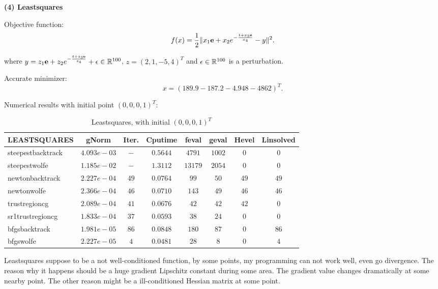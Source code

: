 \documentclass[11pt]{report}
\begin{document}
\textbf{(4) Leastsquares }

Objective function: 
\begin{equation}
    f(x) = \frac{1}{2}\|x_1\mathbf{e}+x_2e^{-\frac{t+x_3\mathbf{e}}{x_4}}-y\|^2.
\end{equation}

where $y=z_1\mathbf{e}+z_2e^{-\frac{t+z_3\mathbf{e}}{z_4}} + \epsilon\in \mathbb{R}^{100}$, $z=(2,1,-5,4)^T$ and $\epsilon\in \mathbb{R}^{100}$ is a perturbation.

Accurate minimizer:
\begin{equation}
   x = (189.9  -187.2  -4.948  -4862)^T.
\end{equation}

Numerical results with initial point $(0,0,0,1)^T$:
\begin{table}[H]
    \caption{Leastsquares, with initial $(0,0,0,1)^T$}
    \label{tab:Leastsquares_initial}
    \begin{center}
        \begin{tabular}{l|ccccccc}
\textbf{LEASTSQUARES}&  gNorm       &   Iter.  &   Cputime   &   feval&geval&Hevel&Linsolved\\
\hline
steepestbacktrack   &   $4.093e-03 $&   $- $&   $0.5644  $&$4791 $&$1002 $&$0    $&$0    $       \\
steepestwolfe       &   $1.185e-02 $&   $- $&   $1.3112  $&$13179$&$2054 $&$0    $&$0    $       \\
newtonbacktrack     &   $2.227e-04 $&   $49   $&   $0.0764  $&$99   $&$50   $&$49   $&$49   $       \\
newtonwolfe         &   $2.366e-04 $&   $46   $&   $0.0710  $&$143  $&$49   $&$46   $&$46   $       \\
trustregioncg       &   $2.089e-04 $&   $41   $&   $0.0676  $&$42   $&$42   $&$42   $&$0    $       \\
sr1trustregioncg    &   $1.833e-04 $&   $37   $&   $0.0593  $&$38   $&$24   $&$0    $&$0    $       \\
bfgsbacktrack       &   $1.981e-05 $&   $86   $&   $0.0848  $&$180  $&$87   $&$0    $&$86   $       \\
bfgswolfe           &   $2.227e-05 $&   $4    $&   $0.0481  $&$28   $&$8    $&$0    $&$4    $       \\
 \end{tabular}
    \end{center}
\end{table}

Leastsquares suppose to be a not well-conditioned function, by some points, my programming can not work well, even go divergence. The reason why it happens should be a huge gradient Lipschitz constant during some area. The gradient value changes dramatically at some nearby point. The other reason might be a ill-conditioned Hessian matrix at some point. 
\end{document}
